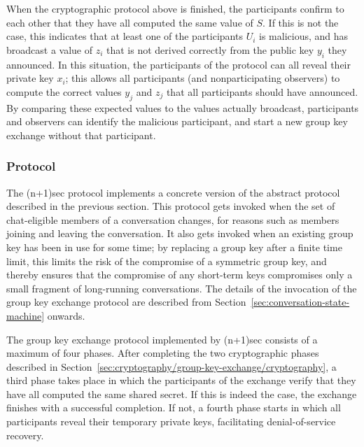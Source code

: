 \documentclass{article}
\begin{document}
When the cryptographic protocol above is finished, the participants confirm to each other that they have all computed the same value of $S$.
If this is not the case, this indicates that at least one of the participants $U_i$ is malicious, and has broadcast a value of $z_i$ that is not derived correctly from the public key $y_i$ they announced.
In this situation, the participants of the protocol can all reveal their private key $x_i$; this allows all participants (and nonparticipating observers) to compute the correct values $y_j$ and $z_j$ that all participants should have announced.
By comparing these expected values to the values actually broadcast, participants and observers can identify the malicious participant, and start a new group key exchange without that participant.

\subsubsection{Protocol}
\label{sec:cryptography/group-key-exchange/protocol}

The (n+1)sec protocol implements a concrete version of the abstract protocol described in the previous section.
This protocol gets invoked when the set of chat-eligible members of a conversation changes, for reasons such as members joining and leaving the conversation.
It also gets invoked when an existing group key has been in use for some time; by replacing a group key after a finite time limit, this limits the risk of the compromise of a symmetric group key, and thereby ensures that the compromise of any short-term keys compromises only a small fragment of long-running conversations.
The details of the invocation of the group key exchange protocol are described from Section~\ref{sec:conversation-state-machine} onwards.

The group key exchange protocol implemented by (n+1)sec consists of a maximum of four phases.
After completing the two cryptographic phases described in Section~\ref{sec:cryptography/group-key-exchange/cryptography}, a third phase takes place in which the participants of the exchange verify that they have all computed the same shared secret.
If this is indeed the case, the exchange finishes with a successful completion.
If not, a fourth phase starts in which all participants reveal their temporary private keys, facilitating denial-of-service recovery.
\end{document}
